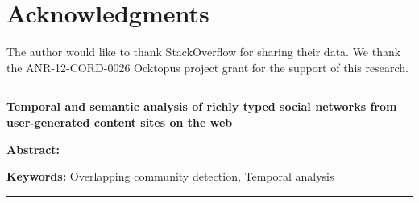 \documentclass[a4paper,11pt,twoside]{ThesisStyle}
\begin{document}


\doublespacing
\dominitoc


 \cleardoublepage

\section*{Acknowledgments}

The author would like to thank StackOverflow for sharing their data. We thank the ANR-12-CORD-0026 Ocktopus project grant for the support of this research. 

\tableofcontents

\mainmatter

















\appendix







\cleardoublepage
\begin{vcenterpage}
\noindent\rule[2pt]{\textwidth}{0.5pt}
\begin{center}
{\large\textbf{Temporal and semantic analysis of richly typed social networks from user-generated content sites on the web\\}}
\end{center}
{\large\textbf{Abstract:}}


{\large\textbf{Keywords:}}
Overlapping community detection, Temporal analysis
\\
\noindent\rule[2pt]{\textwidth}{0.5pt}
\end{vcenterpage}
\end{document}
